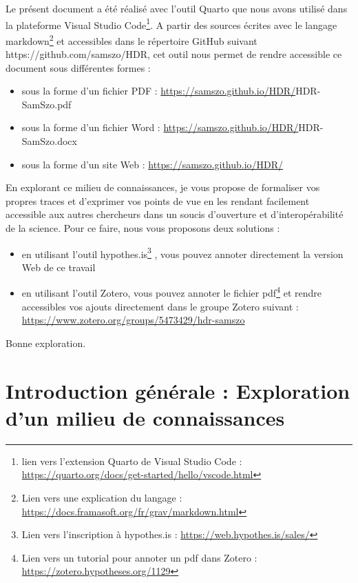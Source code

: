 \documentclass[
  a4paper,
  DIV=11,
  numbers=noendperiod]{scrreprt}
\begin{document}
Le présent document a été réalisé avec l'outil Quarto que nous avons
utilisé dans la plateforme Visual Studio Code\footnote{lien vers
  l'extension Quarto de Visual Studio Code :
  \url{https://quarto.org/docs/get-started/hello/vscode.html}}. A partir
des sources écrites avec le langage markdown\footnote{Lien vers une
  explication du langage :
  \url{https://docs.framasoft.org/fr/grav/markdown.html}} et accessibles
dans le répertoire GitHub suivant https://github.com/samszo/HDR, cet
outil nous permet de rendre accessible ce document sous différentes
formes :

\begin{itemize}
\item
  sous la forme d'un fichier PDF :
  \url{https://samszo.github.io/HDR/}HDR-SamSzo.pdf
\item
  sous la forme d'un fichier Word :
  \url{https://samszo.github.io/HDR/}HDR-SamSzo.docx
\item
  sous la forme d'un site Web : \url{https://samszo.github.io/HDR/}
\end{itemize}

En explorant ce milieu de connaissances, je vous propose de formaliser
vos propres traces et d'exprimer vos points de vue en les rendant
facilement accessible aux autres chercheurs dans un soucis d'ouverture
et d'interopérabilité de la science. Pour ce faire, nous vous proposons
deux solutions :

\begin{itemize}
\item
  en utilisant l'outil hypothes.is\footnote{Lien vers l'inscription à
    hypothes.is : \url{https://web.hypothes.is/sales/}} , vous pouvez
  annoter directement la version Web de ce travail
\item
  en utilisant l'outil Zotero, vous pouvez annoter le fichier
  pdf\footnote{Lien vers un tutorial pour annoter un pdf dans Zotero :
    \url{https://zotero.hypotheses.org/1129}} et rendre accessibles vos
  ajouts directement dans le groupe Zotero suivant :
  \url{https://www.zotero.org/groups/5473429/hdr-samszo}
\end{itemize}

Bonne exploration.


\chapter{Introduction générale : Exploration d'un milieu de
connaissances}\label{sec-part-introGen}
\end{document}
